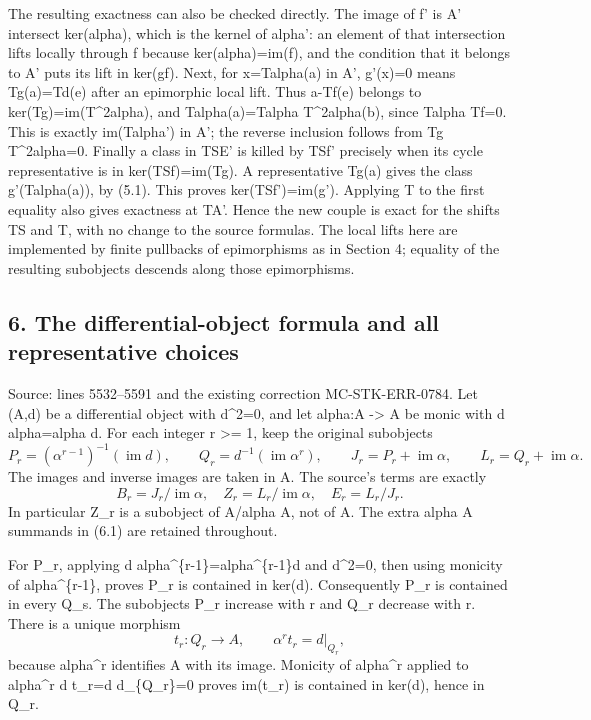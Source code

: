 \documentclass[11pt]{article}
\begin{document}
The resulting exactness can also be checked directly. The image of f' is A' intersect ker(alpha), which is the kernel of alpha': an element of that intersection lifts locally through f because ker(alpha)=im(f), and the condition that it belongs to A' puts its lift in ker(gf). Next, for x=Talpha(a) in A', g'(x)=0 means Tg(a)=Td(e) after an epimorphic local lift. Thus a-Tf(e) belongs to ker(Tg)=im(T\^{}2alpha), and Talpha(a)=Talpha T\^{}2alpha(b), since Talpha Tf=0. This is exactly im(Talpha') in A'; the reverse inclusion follows from Tg T\^{}2alpha=0. Finally a class in TSE' is killed by TSf' precisely when its cycle representative is in ker(TSf)=im(Tg). A representative Tg(a) gives the class g'(Talpha(a)), by (5.1). This proves ker(TSf')=im(g'). Applying T to the first equality also gives exactness at TA'. Hence the new couple is exact for the shifts TS and T, with no change to the source formulas. The local lifts here are implemented by finite pullbacks of epimorphisms as in Section 4; equality of the resulting subobjects descends along those epimorphisms.

\subsection{6. The differential-object formula and all representative choices}\label{note-05-the-differential-object-formula-and-all-representative-choices}

Source: lines 5532--5591 and the existing correction MC-STK-ERR-0784. Let (A,d) be a differential object with d\^{}2=0, and let alpha:A -\textgreater{} A be monic with d alpha=alpha d. For each integer r \textgreater= 1, keep the original subobjects \[
P_r=(\alpha^{r-1})^{-1}(\operatorname{im}d),\qquad
Q_r=d^{-1}(\operatorname{im}\alpha^r),\qquad
J_r=P_r+\operatorname{im}\alpha,\qquad
L_r=Q_r+\operatorname{im}\alpha.                           \tag{6.1}
\] The images and inverse images are taken in A. The source's terms are exactly \[
B_r=J_r/\operatorname{im}\alpha,\quad
Z_r=L_r/\operatorname{im}\alpha,\quad
E_r=L_r/J_r.                                             \tag{6.2}
\] In particular Z\_r is a subobject of A/alpha A, not of A. The extra alpha A summands in (6.1) are retained throughout.

For P\_r, applying d alpha\^{}\{r-1\}=alpha\^{}\{r-1\}d and d\^{}2=0, then using monicity of alpha\^{}\{r-1\}, proves P\_r is contained in ker(d). Consequently P\_r is contained in every Q\_s. The subobjects P\_r increase with r and Q\_r decrease with r. There is a unique morphism \[
t_r:Q_r\longrightarrow A,\qquad
\alpha^r t_r=d|_{Q_r},                                   \tag{6.3}
\] because alpha\^{}r identifies A with its image. Monicity of alpha\^{}r applied to alpha\^{}r d t\_r=d d\textbar\_\{Q\_r\}=0 proves im(t\_r) is contained in ker(d), hence in Q\_r.
\end{document}
